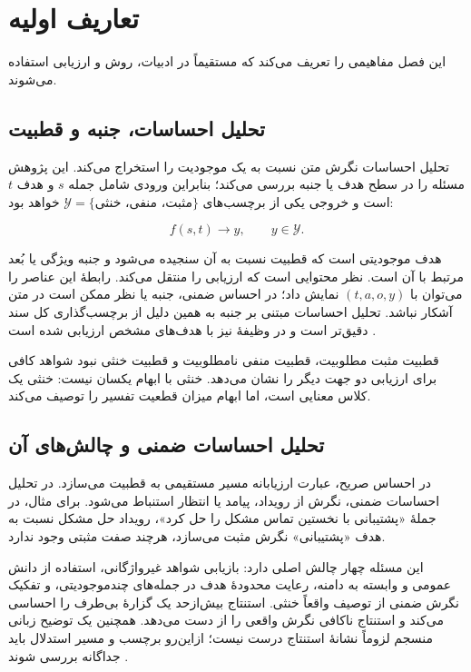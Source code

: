 \chapter{تعاریف اولیه}

این فصل مفاهیمی را تعریف می‌کند که مستقیماً در ادبیات، روش و ارزیابی استفاده می‌شوند.

\section{تحلیل احساسات، جنبه و قطبیت}

تحلیل احساسات نگرش متن نسبت به یک موجودیت را استخراج می‌کند. این پژوهش مسئله را در سطح هدف یا جنبه بررسی می‌کند؛ بنابراین ورودی شامل جمله $s$ و هدف $t$ است و خروجی یکی از برچسب‌های $\mathcal{Y}=\{\text{مثبت، منفی، خنثی}\}$ خواهد بود:

\begin{equation}
    f(s,t) \longrightarrow y, \qquad y \in \mathcal{Y}.
    \label{eq:target-sentiment-function}
\end{equation}

هدف موجودیتی است که قطبیت نسبت به آن سنجیده می‌شود و جنبه ویژگی یا بُعد مرتبط با آن است. نظر محتوایی است که ارزیابی را منتقل می‌کند. رابطۀ این عناصر را می‌توان با $(t,a,o,y)$ نمایش داد؛ در احساس ضمنی، جنبه یا نظر ممکن است در متن آشکار نباشد. تحلیل احساسات مبتنی بر جنبه به همین دلیل از برچسب‌گذاری کل سند دقیق‌تر است و در وظیفۀ  نیز با هدف‌های مشخص ارزیابی شده است \cite{pontiki2014semeval}.

قطبیت مثبت مطلوبیت، قطبیت منفی نامطلوبیت و قطبیت خنثی نبود شواهد کافی برای ارزیابی دو جهت دیگر را نشان می‌دهد. خنثی با ابهام یکسان نیست: خنثی یک کلاس معنایی است، اما ابهام میزان قطعیت تفسیر را توصیف می‌کند.

\section{تحلیل احساسات ضمنی و چالش‌های آن}

در احساس صریح، عبارت ارزیابانه مسیر مستقیمی به قطبیت می‌سازد. در تحلیل احساسات ضمنی، نگرش از رویداد، پیامد یا انتظار استنباط می‌شود. برای مثال، در جملۀ «پشتیبانی با نخستین تماس مشکل را حل کرد»، رویداد حل مشکل نسبت به هدف «پشتیبانی» نگرش مثبت می‌سازد، هرچند صفت مثبتی وجود ندارد.

این مسئله چهار چالش اصلی دارد: بازیابی شواهد غیرواژگانی، استفاده از دانش عمومی و وابسته به دامنه، رعایت محدودۀ هدف در جمله‌های چندموجودیتی، و تفکیک نگرش ضمنی از توصیف واقعاً خنثی. استنتاج بیش‌ازحد یک گزارۀ بی‌طرف را احساسی می‌کند و استنتاج ناکافی نگرش واقعی را از دست می‌دهد. همچنین یک توضیح زبانی منسجم لزوماً نشانۀ استنتاج درست نیست؛ ازاین‌رو برچسب و مسیر استدلال باید جداگانه بررسی شوند \cite{fei2023thor,duan2024isa}.


